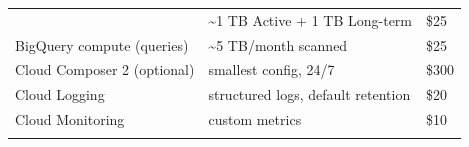 \documentclass[
  11pt,
  british,
  oneside]{book}
\begin{document}
\begin{longtable}[]{@{}lll@{}}
\begin{minipage}[t]{0.30\columnwidth}
\end{minipage} & \begin{minipage}[t]{0.30\columnwidth}\raggedright
\textasciitilde1 TB Active + 1 TB Long-term\strut
\end{minipage} & \begin{minipage}[t]{0.30\columnwidth}\raggedright
\$25\strut
\end{minipage}\tabularnewline
\begin{minipage}[t]{0.30\columnwidth}\raggedright
BigQuery compute (queries)\strut
\end{minipage} & \begin{minipage}[t]{0.30\columnwidth}\raggedright
\textasciitilde5 TB/month scanned\strut
\end{minipage} & \begin{minipage}[t]{0.30\columnwidth}\raggedright
\$25\strut
\end{minipage}\tabularnewline
\begin{minipage}[t]{0.30\columnwidth}\raggedright
Cloud Composer 2 (optional)\strut
\end{minipage} & \begin{minipage}[t]{0.30\columnwidth}\raggedright
smallest config, 24/7\strut
\end{minipage} & \begin{minipage}[t]{0.30\columnwidth}\raggedright
\$300\strut
\end{minipage}\tabularnewline
\begin{minipage}[t]{0.30\columnwidth}\raggedright
Cloud Logging\strut
\end{minipage} & \begin{minipage}[t]{0.30\columnwidth}\raggedright
structured logs, default retention\strut
\end{minipage} & \begin{minipage}[t]{0.30\columnwidth}\raggedright
\$20\strut
\end{minipage}\tabularnewline
\begin{minipage}[t]{0.30\columnwidth}\raggedright
Cloud Monitoring\strut
\end{minipage} & \begin{minipage}[t]{0.30\columnwidth}\raggedright
custom metrics\strut
\end{minipage} & \begin{minipage}[t]{0.30\columnwidth}\raggedright
\$10\strut
\end{minipage}\tabularnewline
\begin{minipage}[t]{0.30\columnwidth}\raggedright

\end{minipage}
\end{longtable}
\end{document}
